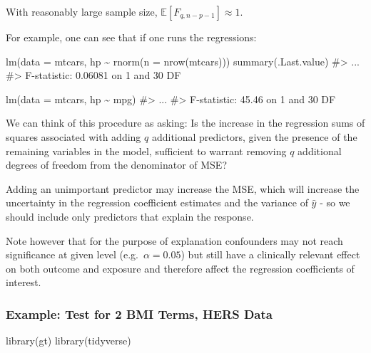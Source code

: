\documentclass[
  letterpaper,
  DIV=11,
  numbers=noendperiod]{scrreport}
\newenvironment{Shaded}{\begin{snugshade}}{\end{snugshade}}
\newcommand{\AttributeTok}[1]{\textcolor[rgb]{0.40,0.45,0.13}{#1}}
\newcommand{\CommentTok}[1]{\textcolor[rgb]{0.37,0.37,0.37}{#1}}
\newcommand{\FunctionTok}[1]{\textcolor[rgb]{0.28,0.35,0.67}{#1}}
\newcommand{\NormalTok}[1]{\textcolor[rgb]{0.00,0.23,0.31}{#1}}
\newcommand{\SpecialCharTok}[1]{\textcolor[rgb]{0.37,0.37,0.37}{#1}}
\begin{document}
With reasonably large sample size, \(\mathbb E[F_{q,n-p-1}] \approx 1\).

For example, one can see that if one runs the regressions:

\begin{Shaded}
\begin{Highlighting}[]
\FunctionTok{lm}\NormalTok{(}\AttributeTok{data =}\NormalTok{ mtcars, hp }\SpecialCharTok{\textasciitilde{}} \FunctionTok{rnorm}\NormalTok{(}\AttributeTok{n =} \FunctionTok{nrow}\NormalTok{(mtcars)))}
\FunctionTok{summary}\NormalTok{(.Last.value)}
\CommentTok{\#\textgreater{} ... }
\CommentTok{\#\textgreater{} F{-}statistic: 0.06081 on 1 and 30 DF}

\FunctionTok{lm}\NormalTok{(}\AttributeTok{data =}\NormalTok{ mtcars, hp }\SpecialCharTok{\textasciitilde{}}\NormalTok{ mpg)}
\CommentTok{\#\textgreater{} ... }
\CommentTok{\#\textgreater{} F{-}statistic: 45.46 on 1 and 30 DF}
\end{Highlighting}
\end{Shaded}

We can think of this procedure as asking: Is the increase in the
regression sums of squares associated with adding \(q\) additional
predictors, given the presence of the remaining variables in the model,
sufficient to warrant removing \(q\) additional degrees of freedom from
the denominator of MSE?

Adding an unimportant predictor may increase the MSE, which will
increase the uncertainty in the regression coefficient estimates and the
variance of \(\hat y\) - so we should include only predictors that
explain the response.

Note however that for the purpose of explanation confounders may not
reach significance at given level (e.g.~\(\alpha = 0.05\)) but still
have a clinically relevant effect on both outcome and exposure and
therefore affect the regression coefficients of interest.

\hypertarget{example-test-for-2-bmi-terms-hers-data}{%
\subsubsection{Example: Test for 2 BMI Terms, HERS
Data}\label{example-test-for-2-bmi-terms-hers-data}}

\begin{Shaded}
\begin{Highlighting}[]
\FunctionTok{library}\NormalTok{(gt)}
\FunctionTok{library}\NormalTok{(tidyverse)}
\end{Highlighting}
\end{Shaded}
\end{document}
